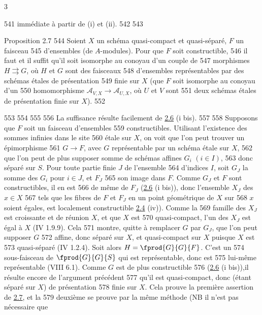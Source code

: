 3	\documentclass[10pt]{../fichiers-configuration-latex/smfart}
\begin{document}
   541	immédiate à partir de (i) et (ii).
   542	
   543	\begin{enonce*}{Proposition 2.7}
   544	Soient $X$ un schéma quasi-compact et quasi-séparé, $F$ un faisceau
   545	d'ensembles (\resp de $A$-modules). Pour que $F$ soit constructible,
   546	il faut et il suffit qu'il soit isomorphe au conoyau d'un couple de
   547	morphismes $H\rightrightarrows G$, où $H$ et $G$ sont des faisceaux
   548	d'ensembles représentables par des schémas étales de présentation
   549	finie sur $X$ (\resp que $F$ soit isomorphe au conoyau d'un
   550	homomorphisme $𝒜_{V,X}\rightarrow 𝒜_{U,X}$, où $U$ et $V$ sont
   551	deux schémas étales de présentation finie sur $X$).
   552	\end{enonce*}
   553	
   554	%
   555	
   556	La suffisance résulte facilement de \hyperref[IX.prop2.6]{2.6} (i bis).
   557	
   558	Supposons que $F$ soit un faisceau d'ensembles
   559	constructibles. Utilisant l'existence des sommes infinies dans le site
   560	étale sur $X$, on voit que l'on peut trouver un épimorphisme
   561	$G\rightarrow F$, avec $G$ représentable par un schéma étale sur $X$,
   562	que l'on peut de plus supposer somme de schémas affines $G_i$ $(i\in I)$,
   563	donc séparé sur $S$. Pour toute partie finie $J$ de l'ensemble
   564	d'indices $I$, soit $G_J$ la somme des $G_i$ pour $i\in J$, et $F_J$
   565	son image dans $F$. Comme $G_J$ et $F$ sont constructibles, il en est
   566	de même de $F_J$ (\hyperref[IX.prop2.6]{2.6} (i bis)), donc l'ensemble $X_J$ des $x\in X$
   567	tels que les fibres de $F$ et $F_J$ en un point géométrique de $X$ sur
   568	$x$ soient égales, est localement constructible \hyperref[IX.prop2.4]{2.4} (iv)). Comme la
   569	famille des $X_J$ est croissante et de réunion $X$, et que $X$ est
   570	quasi-compact, l'un des $X_J$ est égal à $X$ (\EGA IV 1.9.9). Cela
   571	montre, quitte à remplacer $G$ par $G_J$, que l'on peut supposer $G$
   572	affine, donc séparé sur $X$, et quasi-compact sur $X$ puisque $X$ est
   573	quasi-séparé (\EGA IV 1.2.4). Soit alors $H=\fprod{G}{G}{F}$. C'est un
   574	sous-faisceau de $\fprod{G}{G}{S}$ qui est représentable, donc est
   575	lui-même représentable (VIII 6.1). Comme $G$ est de plus constructible
   576	(\hyperref[IX.prop2.6]{2.6} (i bis)),\pageoriginale il résulte encore de l'argument précédent
   577	qu'il est quasi-compact, donc (étant séparé sur $X$) de présentation
   578	finie sur $X$. Cela prouve la première assertion de \hyperref[IX.prop2.7]{2.7}, et la
   579	deuxième se prouve par la même méthode (NB il n'est pas nécessaire que
\end{document}
